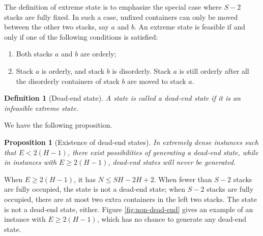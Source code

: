 \documentclass[review,3p,times,12pt,number]{elsarticle}\usepackage{amsmath}\usepackage{amssymb}
\newtheorem{proposition}{Proposition}
\newtheorem{definition}{Definition}
\begin{document}
The definition of extreme state is to emphasize the special case where $S-2$ stacks are fully fixed. In such a case, unfixed containers can only be moved between the other two stacks, say $a$ and $b$. An extreme state is feasible if and only if one of the following conditions is satisfied:
\begin{enumerate}
\item Both stacks $a$ and $b$ are orderly;
\item Stack $a$ is orderly, and stack $b$ is disorderly. Stack $a$ is still orderly after all the disorderly containers of stack $b$ are moved to stack $a$.
\end{enumerate}

\begin{definition}[Dead-end state]
A state is called a dead-end state if it is an infeasible extreme state.
\end{definition}


We have the following proposition.

\begin{proposition}[Existence of dead-end states]
In extremely dense instances such that $E<2(H-1)$, there exist possibilities of generating a dead-end state, while in instances with $E\ge2(H-1)$, dead-end states will never be generated.
\end{proposition}

When $E\ge 2(H-1)$, it has $N\le SH-2H+2$. When fewer than $S-2$ stacks are fully occupied, the state is not a dead-end state; when $S-2$ stacks are fully occupied, there are at most two extra containers in the left two stacks. The state is not a dead-end state, either. 
Figure \ref{fig:non-dead-end} gives an example of an instance with $E\ge2(H-1)$, which has no chance to generate any dead-end state.
\end{document}
